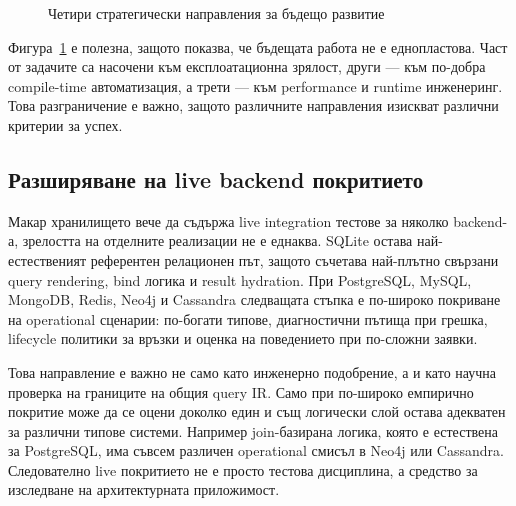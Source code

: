 \begin{figure}[H]
\centering
{}
\caption{Четири стратегически направления за бъдещо развитие}
\label{fig:future_work_axes}
\end{figure}

Фигура~\ref{fig:future_work_axes} е полезна, защото показва, че бъдещата работа не е еднопластова. Част от задачите са насочени към експлоатационна зрялост, други --- към по-добра compile-time автоматизация, а трети --- към performance и runtime инженеринг. Това разграничение е важно, защото различните направления изискват различни критерии за успех.

\subsection{Разширяване на live backend покритието}

Макар хранилището вече да съдържа live integration тестове за няколко backend-а, зрелостта на отделните реализации не е еднаква. SQLite остава най-естественият референтен релационен път, защото съчетава най-плътно свързани query rendering, bind логика и result hydration. При PostgreSQL, MySQL, MongoDB, Redis, Neo4j и Cassandra следващата стъпка е по-широко покриване на operational сценарии: по-богати типове, диагностични пътища при грешка, lifecycle политики за връзки и оценка на поведението при по-сложни заявки.

Това направление е важно не само като инженерно подобрение, а и като научна проверка на границите на общия query IR. Само при по-широко емпирично покритие може да се оцени доколко един и същ логически слой остава адекватен за различни типове системи. Например join-базирана логика, която е естествена за PostgreSQL, има съвсем различен operational смисъл в Neo4j или Cassandra. Следователно live покритието не е просто тестова дисциплина, а средство за изследване на архитектурната приложимост.

